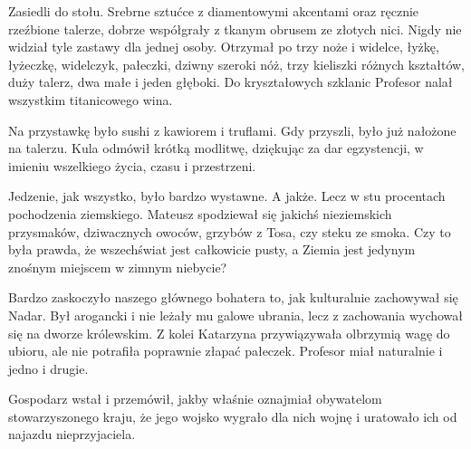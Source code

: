 \divider{}

Zasiedli do stołu. Srebrne sztućce z diamentowymi akcentami oraz ręcznie rzeźbione talerze, dobrze współgrały z tkanym obrusem ze złotych nici.
Nigdy nie widział tyle zastawy dla jednej osoby. 
Otrzymał po trzy noże i widelce, łyżkę, łyżeczkę, widelczyk, pałeczki, dziwny szeroki nóż, trzy kieliszki różnych kształtów, duży talerz, dwa małe i jeden głęboki.
Do kryształowych szklanic Profesor nalał wszystkim titanicowego wina.

Na przystawkę było sushi z kawiorem i truflami. Gdy przyszli, było już nałożone na talerzu. 
Kula odmówił krótką modlitwę, dziękując za dar egzystencji, w imieniu wszelkiego życia, czasu i przestrzeni.

Jedzenie, jak wszystko, było bardzo wystawne. A jakże. Lecz w stu procentach pochodzenia ziemskiego.
Mateusz spodziewał się jakichś nieziemskich przysmaków, dziwacznych owoców, grzybów z Tosa, czy steku ze smoka.
Czy to była prawda, że wszechświat jest całkowicie pusty, a Ziemia jest jedynym znośnym miejscem w zimnym niebycie?

Bardzo zaskoczyło naszego głównego bohatera to, jak kulturalnie zachowywał się Nadar. Był arogancki i nie leżały mu galowe ubrania, lecz z zachowania wychował się na dworze królewskim.
Z kolei Katarzyna przywiązywała olbrzymią wagę do ubioru, ale nie potrafiła poprawnie złapać pałeczek.
Profesor miał naturalnie i jedno i drugie.

Gospodarz wstał i przemówił, jakby właśnie oznajmiał obywatelom stowarzyszonego kraju, że jego wojsko wygrało dla nich wojnę i uratowało ich od najazdu nieprzyjaciela.

